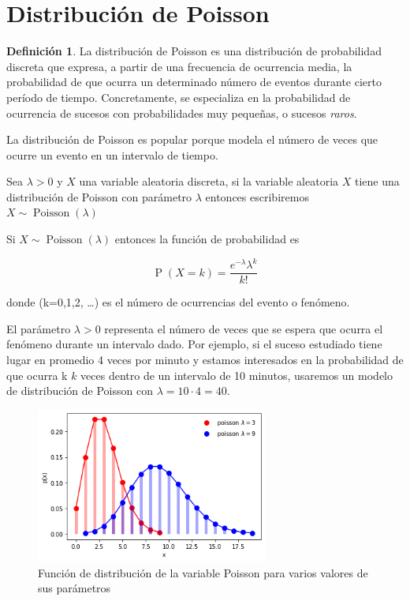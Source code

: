 \documentclass[]{book}
\theoremstyle{plain}
\theoremstyle{definition}
\newtheorem{definition}[theorem]{Definición}
\theoremstyle{definition} %
\begin{document}
\section{Distribución de Poisson} 

\begin{definition}
  La distribución de Poisson es una distribución de probabilidad discreta
que expresa, a partir de una frecuencia de ocurrencia media, la
probabilidad de que ocurra un determinado número de eventos durante
cierto período de tiempo. Concretamente, se especializa en la
probabilidad de ocurrencia de sucesos con probabilidades muy pequeñas, o
sucesos \emph{raros}.

La distribución de Poisson es popular porque modela el número de veces
que ocurre un evento en un intervalo de tiempo.

Sea \(\displaystyle \lambda >0\) y \(X\) una variable aleatoria
discreta, si la variable aleatoria \(X\) tiene una distribución de
Poisson con parámetro \(\lambda\) entonces escribiremos
\(\displaystyle X\sim \operatorname {Poisson} (\lambda )\)

Si \(\displaystyle X\sim \operatorname {Poisson} (\lambda )\) entonces
la función de probabilidad es

\[\displaystyle \operatorname {P} (X=k)={\frac {e^{-\lambda }\lambda ^{k}}{k!}}\]

donde (k=0,1,2, \dots ) es el número de ocurrencias del evento o
fenómeno.

El parámetro \(\displaystyle \lambda >0\) representa el número de veces
que se espera que ocurra el fenómeno durante un intervalo dado. Por
ejemplo, si el suceso estudiado tiene lugar en promedio 4 veces por
minuto y estamos interesados en la probabilidad de que ocurra k \(k\)
veces dentro de un intervalo de 10 minutos, usaremos un modelo de
distribución de Poisson con \(\lambda = 10\cdot 4 = 40\).
\end{definition}


\begin{figure}
  \centering
  \includegraphics[width=3in,height=\textheight]{img/poisson.png}
  \caption{Función de distribución de la variable Poisson para varios valores de sus parámetros}
\end{figure}
\end{document}
